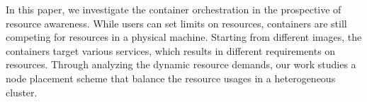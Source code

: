 In this paper, we investigate the container orchestration in the prospective of resource awareness. 
While users can set limits on resources, containers are still competing for resources in a physical machine.
Starting from different images, the containers target various services, which results in different requirements on resources.
Through analyzing the dynamic resource demands, our work studies a node placement scheme that balance the resource usages in a 
heterogeneous cluster. 



